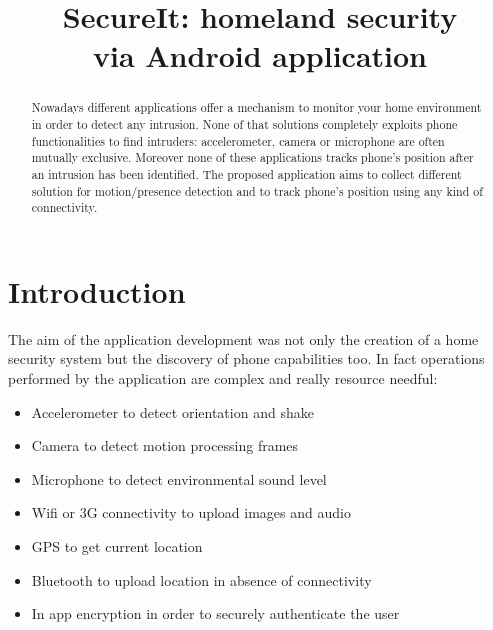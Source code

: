 \documentclass[conference]{IEEEtran}
\begin{document}
\title{SecureIt: homeland security\\
via Android application}

\author{
}


\maketitle


\begin{abstract}
Nowadays different applications offer a mechanism to monitor your home environment in order to detect any intrusion. None of that solutions completely exploits phone functionalities to find intruders: accelerometer, camera or microphone are often mutually exclusive. Moreover none of these applications tracks phone's position after an intrusion has been identified. The proposed application aims to collect different solution for motion/presence detection and to track phone's position using any kind of connectivity.
\end{abstract}

\IEEEpeerreviewmaketitle

\section{\textbf{Introduction}}

The aim of the application development was not only the creation of a home security system but the discovery of phone capabilities too. In fact operations performed by the application are complex and really resource needful:
\begin{itemize}
	\item Accelerometer to detect orientation and shake
	\item Camera to detect motion processing frames
	\item Microphone to detect environmental sound level
	\item Wifi or 3G connectivity to upload images and audio
	\item GPS to get current location
	\item Bluetooth to upload location in absence of connectivity
	\item In app encryption in order to securely authenticate the user
\end{itemize}
\end{document}
